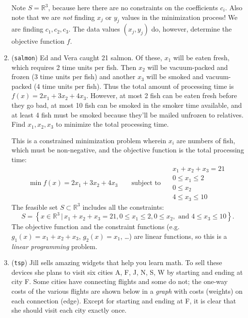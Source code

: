 \documentclass[11pt]{amsart}
\newcommand{\RR}{\mathbb{R}}
\begin{document}
\begin{enumerate}
Note $S=\RR^3$, because here there are no constraints on the coefficients $c_i$.  Also note that we are \emph{not} finding $x_j$ or $y_j$ values in the minimization process!  We are finding $c_1,c_2,c_3$.  The data values $(x_j,y_j)$ do, however, determine the objective function $f$.

\bigskip
\item (\texttt{salmon})  \quad Ed and Vera caught 21 salmon.  Of these, $x_1$ will be eaten fresh, which requires 2 time units per fish.  Then $x_2$ will be vacuum-packed and frozen (3 time units per fish) and another $x_3$ will be smoked and vacuum-packed (4 time units per fish).  Thus the total amount of processing time is $f(x) = 2 x_1 + 3 x_2 + 4 x_3$.  However, at most 2 fish can be eaten fresh before they go bad, at most 10 fish can be smoked in the smoker time available, and at least 4 fish must be smoked because they'll be mailed unfrozen to relatives.  Find $x_1,x_2,x_3$ to minimize the total processing time.

This is a constrained minimization problem wherein $x_i$ are numbers of fish, which must be non-negative, and the objective function is the total processing time:
	$$\min f(x) = 2 x_1 + 3 x_2 + 4 x_3 \qquad \text{subject to }\quad \begin{matrix} x_1 + x_2 + x_3 = 21 \\ 0 \le x_1 \le 2 \\ 0 \le x_2 \\ 4 \le x_3 \le 10 \end{matrix}$$
The feasible set $S\subset \RR^3$ includes all the constraints:
    $$S = \left\{x \in \RR^3\,\big|\,x_1 + x_2 + x_3 = 21, 0 \le x_1 \le 2, 0 \le x_2, \text{ and } 4 \le x_3 \le 10\right\}.$$
The objective function and the constraint functions (e.g.~$g_1(x)=x_1+x_2+x_3$, $g_2(x)=x_1$, \dots) are linear functions, so this is a \emph{linear programming} problem.

\clearpage \newpage
\item (\texttt{tsp})  \quad Jill sells amazing widgets that help you learn math.  To sell these devices she plans to visit six cities A, F, J, N, S, W by starting and ending at city F.  Some cities have connecting flights and some do not; the one-way costs of the various flights are shown below in a \emph{graph} with costs (weights) on each connection (edge).  Except for starting and ending at F, it is clear that she should visit each city exactly once.

\begin{center}
\vspace{-5mm}
\end{center}
\end{enumerate}
\end{document}
